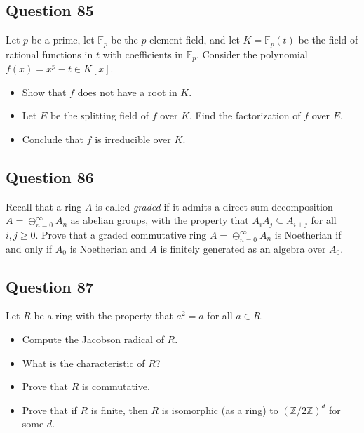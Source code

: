 \documentclass[12pt]{article}
\begin{document}
\hypertarget{question-85}{%
\subsection{Question 85}\label{question-85}}

Let \(p\) be a prime, let \(\mathbb F_p\) be the \(p\)-element field,
and let \(K=\mathbb F_p(t)\) be the field of rational functions in \(t\)
with coefficients in \(\mathbb F_p\). Consider the polynomial
\(f(x)= x^p-t\in K[x]\).

\begin{itemize}
\item
  Show that \(f\) does not have a root in \(K\).
\item
  Let \(E\) be the splitting field of \(f\) over \(K\). Find the
  factorization of \(f\) over \(E\).
\item
  Conclude that \(f\) is irreducible over \(K\).
\end{itemize}

\hypertarget{question-86}{%
\subsection{Question 86}\label{question-86}}

Recall that a ring \(A\) is called \textit{graded} if it admits a direct
sum decomposition \(A=\oplus_{n=0}^{\infty}A_n\) as abelian groups, with
the property that \(A_iA_j\subseteq A_{i+j}\) for all \(i,j\geq 0\).
Prove that a graded commutative ring \(A=\oplus_{n=0}^{\infty} A_n\) is
Noetherian if and only if \(A_0\) is Noetherian and \(A\) is finitely
generated as an algebra over \(A_0\).

\hypertarget{question-87}{%
\subsection{Question 87}\label{question-87}}

Let \(R\) be a ring with the property that \(a^2=a\) for all \(a\in R\).

\begin{itemize}
\item
  Compute the Jacobson radical of \(R\).
\item
  What is the characteristic of \(R\)?
\item
  Prove that \(R\) is commutative.
\item
  Prove that if \(R\) is finite, then \(R\) is isomorphic (as a ring) to
  \((\mathbb Z/2\mathbb Z)^d\) for some \(d\).
\end{itemize}
\end{document}
